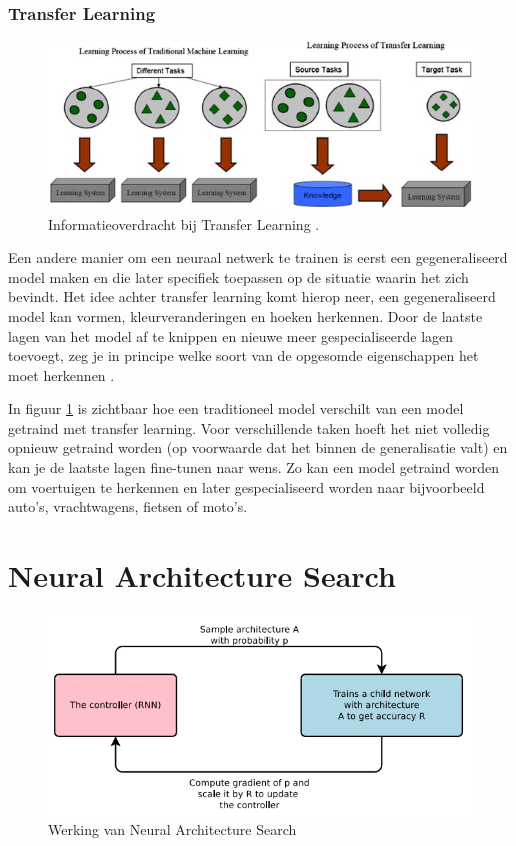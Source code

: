 \subsubsection{Transfer Learning}
\label{subsubsec:transfer-learning}

\begin{figure}
    \includegraphics[width=\linewidth]{img/transfer-learning.jpg}
    \caption{Informatieoverdracht bij Transfer Learning \autocite{Pan2009}.}
    \label{fig:transfer-learning}
\end{figure}

Een andere manier om een neuraal netwerk te trainen is eerst een gegeneraliseerd model maken en die later specifiek toepassen op de situatie waarin het zich bevindt. Het idee achter transfer learning komt hierop neer, een gegeneraliseerd model kan vormen, kleurveranderingen en hoeken herkennen. Door de laatste lagen van het model af te knippen en nieuwe meer gespecialiseerde lagen toevoegt, zeg je in principe welke soort van de opgesomde eigenschappen het moet herkennen \autocite{Khandelwal2019}. 

In figuur \ref{fig:transfer-learning} is zichtbaar hoe een traditioneel model verschilt van een model getraind met transfer learning. Voor verschillende taken hoeft het niet volledig opnieuw getraind worden (op voorwaarde dat het binnen de generalisatie valt) en kan je de laatste lagen fine-tunen naar wens. Zo kan een model getraind worden om voertuigen te herkennen en later gespecialiseerd worden naar bijvoorbeeld auto's, vrachtwagens, fietsen of moto's.

\section{Neural Architecture Search}
\label{sec:nas}

\begin{figure}
    \includegraphics[width=\linewidth]{img/nas.png}
    \caption{Werking van Neural Architecture Search \autocite{ZophL2016}}
    \label{fig:nas-bp}
\end{figure}

